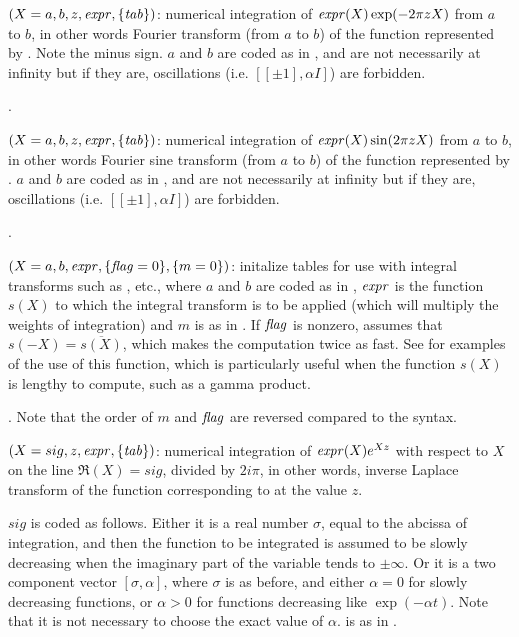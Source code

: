 $(X=a,b,z,\hbox{\it expr\/},\{\hbox{\it tab\/}\})$: numerical
integration of $\hbox{\it expr\/}(X)\exp(-2\pi zX)$ from $a$ to $b$, in other words
Fourier transform (from $a$ to $b$) of the function represented by
. Note the minus sign. $a$ and $b$ are coded as in ,
and are not necessarily at infinity but if they are, oscillations (i.e.
$[[\pm1],\alpha I]$) are forbidden.

.

$(X=a,b,z,\hbox{\it expr\/},\{\hbox{\it tab\/}\})$: numerical
integration of $\hbox{\it expr\/}(X)\sin(2\pi zX)$ from $a$ to $b$, in other words
Fourier sine transform (from $a$ to $b$) of the function represented by
. $a$ and $b$ are coded as in , and are not necessarily
at infinity but if they are, oscillations (i.e. $[[\pm1],\alpha I]$) are
forbidden.

.

$(X=a,b,\hbox{\it expr\/},\{\hbox{\it f\kern0pt lag\/}=0\},\{m=0\})$:
initalize tables for use with integral transforms such as ,
etc., where $a$ and $b$ are coded as in , $\hbox{\it expr\/}$ is the
function $s(X)$ to which the integral transform is to be applied (which will
multiply the weights of integration) and $m$ is as in . If
$\hbox{\it f\kern0pt lag\/}$ is nonzero, assumes that $s(-X)=\overline{s(X)}$, which makes the
computation twice as fast. See  for examples of the
use of this function, which is particularly useful when the function $s(X)$
is lengthy to compute, such as a gamma product.

.
Note that the order of $m$ and $\hbox{\it f\kern0pt lag\/}$ are reversed compared to the 
syntax.

$(X=sig,z,\hbox{\it expr\/},\{\hbox{\it tab\/}\})$:
numerical integration of $\hbox{\it expr\/}(X)e^{Xz}$ with respect to $X$ on the line
$\Re(X)=sig$, divided by $2i\pi$, in other words, inverse Laplace transform
of the function corresponding to  at the value $z$.

$sig$ is coded as follows. Either it is a real number $\sigma$, equal to the
abcissa of integration, and then the function to be integrated is assumed to
be slowly decreasing when the imaginary part of the variable tends to
$\pm\infty$. Or it is a two component vector $[\sigma,\alpha]$, where
$\sigma$ is as before, and either $\alpha=0$ for slowly decreasing functions,
or $\alpha>0$ for functions decreasing like $\exp(-\alpha t)$. Note that it
is not necessary to choose the exact value of $\alpha$.  is as in
.


